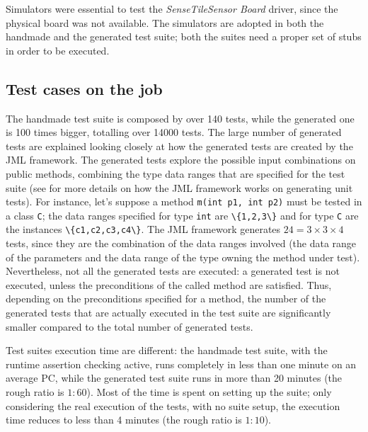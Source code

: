 \documentclass[english]{lni}
\newcommand{\lil}[1]{\texttt{\lstinline|#1|}}
\newcommand{\ST}{\emph{SenseTile}\xspace}
\newcommand{\SB}{\emph{Sensor Board}\xspace}
\newcommand{\STSB}{\ST \SB\xspace}
\begin{document}
Simulators were essential to test the \STSB driver, since the physical board was not available.
The simulators are adopted in both the handmade and the generated test suite; both the suites need a proper set of stubs in order to be executed.



\subsection{Test cases on the job}
\label{subsec:test_cases_on_the_job}

The handmade test suite is composed by over 140 tests, while the generated one is 100 times bigger, totalling over 14000 tests.
The large number of generated tests are explained looking closely at how the generated tests are created by the JML framework. 
The generated tests explore the possible input combinations on public methods, combining the type data ranges that are specified for the test suite (see \cite{Cheon-Leavens02} for more details on how the JML framework works on generating unit tests). 
For instance, let's suppose a method \lil{m(int p1, int p2)} must be tested in a class \lil{C}; the data ranges specified for type \lil{int} are \lil{\{1,2,3\}} and for type \lil{C} are the instances \lil{\{c1,c2,c3,c4\}}. 
The JML framework generates $24 = 3 \times 3 \times 4$ tests, since they are the combination of the data ranges involved (the data range of the parameters and the data range of the type owning the method under test). 
Nevertheless, not all the generated tests are executed: a generated test is not executed, unless the preconditions of the called method are satisfied. 
Thus, depending on the preconditions specified for a method, the number of the generated tests that are actually executed in the test suite are significantly smaller compared to the total number of generated tests.

Test suites execution time are different: the handmade test suite, with the runtime assertion checking active, runs completely in less than one minute on an average PC, while the generated test suite runs in more than 20 minutes (the rough ratio is $ 1 : 60 $). 
Most of the time is spent on setting up the suite; only considering the real execution of the tests, with no suite setup, the execution time reduces to less than 4 minutes (the rough ratio is $ 1 : 10 $).
\end{document}
